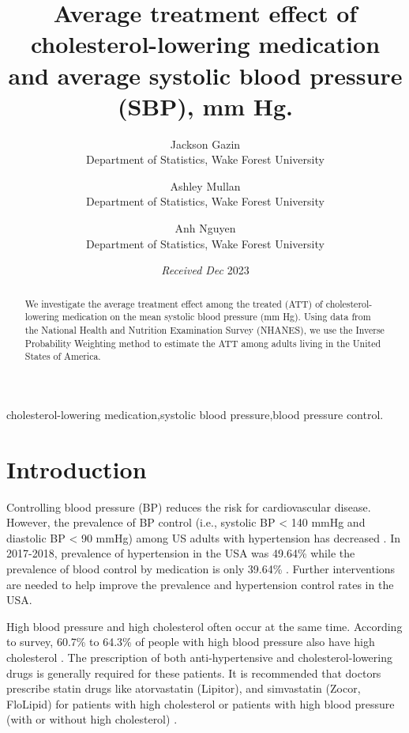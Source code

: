 \documentclass[useAMS,usenatbib,referee]{biom}
\title[]{Average treatment effect of cholesterol-lowering medication and
average systolic blood pressure (SBP), mm Hg.}
\author{ Jackson
Gazin \email{\href{mailto:gazij22@wfu.edu}{\nolinkurl{gazij22@wfu.edu}}} \\ Department
of Statistics, Wake Forest University  \and
		 Ashley
Mullan \email{\href{mailto:mullae22@wfu.edu}{\nolinkurl{mullae22@wfu.edu}}} \\ Department
of Statistics, Wake Forest University  \and
		 Anh
Nguyen \email{\href{mailto:nguyp22@wfu.edu}{\nolinkurl{nguyp22@wfu.edu}}} \\ Department
of Statistics, Wake Forest University 
	   }
\begin{document}
\date{{\it Received Dec} 2023}

\pagerange{\pageref{firstpage}--\pageref{lastpage}} 



\label{firstpage}


\begin{abstract}
We investigate the average treatment effect among the treated (ATT) of
cholesterol-lowering medication on the mean systolic blood pressure (mm
Hg). Using data from the National Health and Nutrition Examination
Survey (NHANES), we use the Inverse Probability Weighting method to
estimate the ATT among adults living in the United States of America.
\end{abstract}

%
%

\begin{keywords}
cholesterol-lowering medication,systolic blood pressure,blood pressure
control.
\end{keywords}

\maketitle

\hypertarget{intro}{%
\section{Introduction}\label{intro}}

Controlling blood pressure (BP) reduces the risk for cardiovascular
disease. However, the prevalence of BP control (i.e., systolic BP
\textless{} 140 mmHg and diastolic BP \textless{} 90 mmHg) among US
adults with hypertension has decreased \citep{cdc_prevalence_nodate}. In
2017-2018, prevalence of hypertension in the USA was 49.64\% while the
prevalence of blood control by medication is only 39.64\%
\citep{chobufo_prevalence_2020}. Further interventions are needed to
help improve the prevalence and hypertension control rates in the USA.

High blood pressure and high cholesterol often occur at the same time.
According to survey, 60.7\% to 64.3\% of people with high blood pressure
also have high cholesterol \citep{egan_blood_2013}. The prescription of
both anti-hypertensive and cholesterol-lowering drugs is generally
required for these patients. It is recommended that doctors prescribe
statin drugs like atorvastatin (Lipitor), and simvastatin (Zocor,
FloLipid) for patients with high cholesterol or patients with high blood
pressure (with or without high cholesterol)
\citep{williams_facing_2020}.
\end{document}
